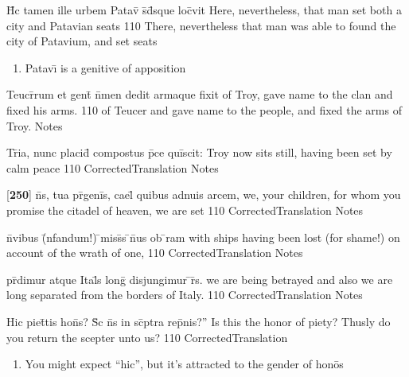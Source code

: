 \latline
  {H\={\macron {\i}}c tamen ille urbem Patav\={\macron {\i}} s\={}d\={}sque loc\={}vit}
  { Here, nevertheless, that man set both a city and Patavian seats }
  {110}
  { There, nevertheless that man was able to found the city of Patavium, and set seats }
  { \begin{enumerate}
  	\item Patav\={\i} is a genitive of apposition
  \end{enumerate} }


\latline
  {Teucr\={}rum et gent\={\macron {\i}} n\={}men dedit armaque fixit}
  { of Troy, gave name to the clan and fixed his arms. }
  {110}
  { of Teucer and gave name to the people, and fixed the arms of Troy. }
  { Notes }


\latline
  {Tr\={}ia, nunc placid\={} compostus p\={}ce qui\={}scit:}
  { Troy now sits still, having been set by calm peace  }
  {110}
  { CorrectedTranslation }
  { Notes }


\latline
  {[\textbf{250}] n\={}s, tua pr\={}geni\={}s, cael\={\macron {\i}} quibus adnuis arcem,}
  { we, your children, for whom you promise the citadel of heaven, we are set  }
  {110}
  { CorrectedTranslation }
  { Notes }


\latline
  {n\={}vibus (\={\macron {\i}}nfandum!) \={}miss\={\macron {\i}}s \={}n\={\macron {\i}}us ob \={\macron {\i}}ram}
  { with ships having been lost (for shame!) on account of the wrath of one,  }
  {110}
  { CorrectedTranslation }
  { Notes }


\latline
  {pr\={}dimur atque Ital\={\macron {\i}}s long\={} disjungimur \={}r\={\macron {\i}}s.}
  { we are being betrayed and also we are long separated from the borders of Italy. }
  {110}
  { CorrectedTranslation }
  { Notes }


\latline
  {Hic piet\={}tis hon\={}s?  S\={\macron {\i}}c n\={}s in sc\={}ptra rep\={}nis?''}
  { Is this the honor of piety?  Thusly do you return the scepter unto us? }
  {110}
  { CorrectedTranslation }
  { \begin{enumerate}
  	\item You might expect ``hic'', but it's attracted to the gender of hon\={o}s
  \end{enumerate} }